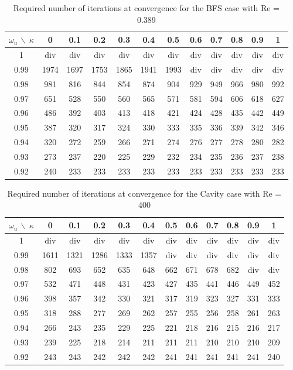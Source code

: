\documentclass[final,3p,times,11pt,onecolumn]{myElsarticle}
\numberwithin{equation}{section}
\begin{document}
\begin{table}[b!!]
\centering
\begin{tabular}{c|ccccccccccc}
\hline 
$\omega_u\,\backslash\:\kappa$ & 0 & 0.1 & 0.2 & 0.3 & 0.4 & 0.5 & 0.6 & 0.7 & 0.8 & 0.9 & 1 \\ 
\hline 
1 & div & div & div & div & div & div & div & div & div & div & div \\ 
0.99 & 1974 & 1697 & 1753 & 1865 & 1941 & 1993 & div & div & div & div & div \\ 
0.98 & 981 & 816 & 844 & 854 & 874 & 904 & 929 & 949 & 966 & 980 & 992 \\ 
0.97 & 651 & 528 & 550 & 560 & 565 & 571 & 581 & 594 & 606 & 618 & 627 \\ 
0.96 & 486 & 392 & 403 & 413 & 418 & 421 & 424 & 428 & 435 & 442 & 449 \\ 
0.95 & 387 & 320 & 317 & 324 & 330 & 333 & 335 & 336 & 339 & 342 & 346 \\ 
0.94 & 320 & 272 & 259 & 266 & 271 & 274 & 276 & 277 & 278 & 280 & 282 \\ 
0.93 & 273 & 237 & 220 & 225 & 229 & 232 & 234 & 235 & 236 & 237 & 238 \\ 
0.92 & 240 & 233 & 233 & 233 & 233 & 233 & 233 & 233 & 233 & 233 & 233 \\ 
\hline 
\end{tabular}
\caption{Required number of iterations at convergence for the BFS case with Re = 0.389}
\label{Table:BFS_LowRe}
\end{table}
\begin{table}[t!!]
\centering
\begin{tabular}{c|ccccccccccc}
\hline 
$\omega_u\,\backslash\:\kappa$ & 0 & 0.1 & 0.2 & 0.3 & 0.4 & 0.5 & 0.6 & 0.7 & 0.8 & 0.9 & 1 \\ 
\hline 
1 & div & div & div & div & div & div & div & div & div & div & div \\ 
0.99 & 1611 & 1321 & 1286 & 1333 & 1357 & div & div & div & div & div & div \\ 
0.98 & 802 & 693 & 652 & 635 & 648 & 662 & 671 & 678 & 682 & div & div \\ 
0.97 & 532 & 471 & 448 & 431 & 423 & 427 & 435 & 441 & 446 & 449 & 452 \\ 
0.96 & 398 & 357 & 342 & 330 & 321 & 317 & 319 & 323 & 327 & 331 & 333 \\ 
0.95 & 318 & 288 & 277 & 269 & 262 & 257 & 255 & 256 & 258 & 261 & 263 \\ 
0.94 & 266 & 243 & 235 & 229 & 225 & 221 & 218 & 216 & 215 & 216 & 217 \\ 
0.93 & 239 & 225 & 218 & 214 & 211 & 211 & 211 & 210 & 210 & 210 & 209 \\ 
0.92 & 243 & 243 & 242 & 242 & 242 & 241 & 241 & 241 & 241 & 241 & 240 \\ 
\hline 
\end{tabular}
\caption{Required number of iterations at convergence for the Cavity case with Re = 400}
\label{Table:Cavity_HighRe}
\end{table}
\end{document}
